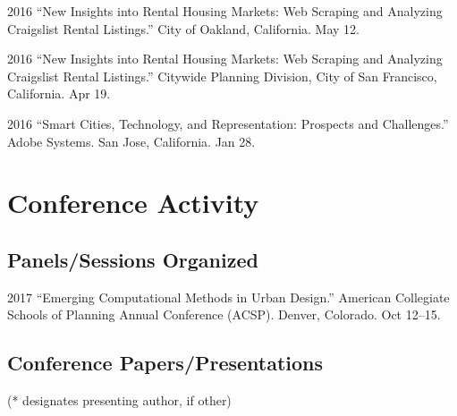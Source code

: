 \documentclass{academiccv}
\begin{document}
\begin{tablist}
\item[2016] \tab \enquote{New Insights into Rental Housing Markets: Web Scraping and Analyzing Craigslist Rental Listings.} City of Oakland, California. May 12.

\item[2016] \tab \enquote{New Insights into Rental Housing Markets: Web Scraping and Analyzing Craigslist Rental Listings.} Citywide Planning Division, City of San Francisco, California. Apr 19.

\item[2016] \tab \enquote{Smart Cities, Technology, and Representation: Prospects and Challenges.} Adobe Systems. San Jose, California. Jan 28.

\end{tablist}



\section*{Conference Activity}

\subsection*{Panels/Sessions Organized}

\begin{tablist}
	
\item[2017] \tab \enquote{Emerging Computational Methods in Urban Design.} American Collegiate Schools of Planning Annual Conference (ACSP). Denver, Colorado. Oct 12--15.
	
\end{tablist}

\subsection*{Conference Papers/Presentations}

(* designates presenting author, if other)\bigskip
\end{document}
